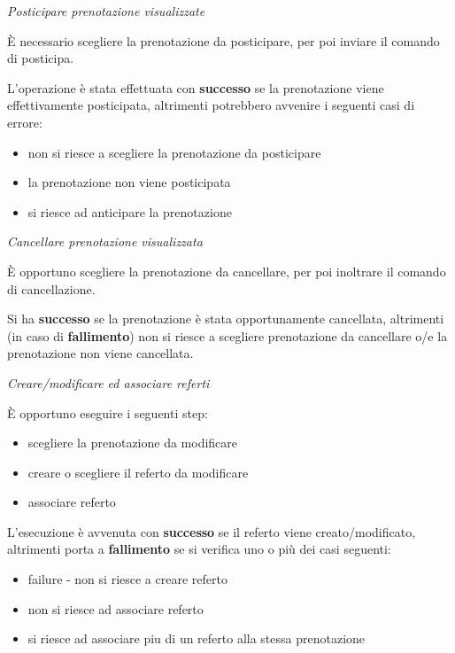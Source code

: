 \begin{description}
\begin{itemize}
                                                                                                                                   

\diam \textit{Posticipare prenotazione visualizzate}

  È necessario scegliere la prenotazione da posticipare, per poi inviare il comando
  di posticipa.
  
  L'operazione è stata effettuata con \textbf{successo} se la prenotazione viene
  effettivamente posticipata, altrimenti potrebbero avvenire i seguenti casi di
  errore:
  \begin{itemize}
  \item non si riesce a scegliere la prenotazione da posticipare
  \item la prenotazione non viene posticipata
  \item si riesce ad anticipare la prenotazione
  \end{itemize}

                                                                                                                                   

\diam \textit{Cancellare prenotazione visualizzata}


  È opportuno scegliere la prenotazione da cancellare, per poi inoltrare il 
  comando di cancellazione.


  Si ha \textbf{successo} se la prenotazione è stata opportunamente cancellata, altrimenti
  (in caso di \textbf{fallimento}) non si riesce a scegliere prenotazione da cancellare o/e
  la prenotazione non viene cancellata.

                                                                                                                                   
  
\diam \textit{Creare/modificare ed associare referti}

  È opportuno eseguire i seguenti step:
  \begin{itemize}
  \item scegliere la prenotazione da modificare
  \item creare o scegliere il referto da modificare
  \item associare referto
  \end{itemize}

  L'esecuzione è avvenuta con \textbf{successo} se il referto viene creato/modificato,
  altrimenti porta a \textbf{fallimento} se si verifica uno o più dei casi seguenti:
  \begin{itemize}
  \item failure - non si riesce a creare referto
  \item non si riesce ad associare referto
  \item si riesce ad associare piu di un referto alla stessa prenotazione
  \end{itemize}


\end{itemize}
\end{description}
